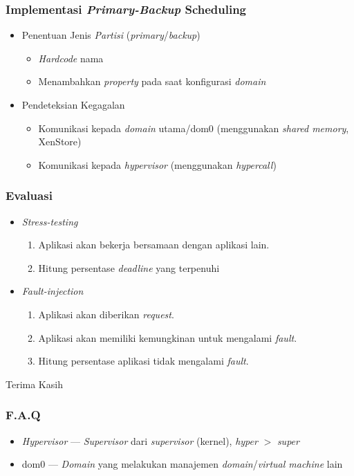 \documentclass[xetex]{beamer}
\begin{document}
    \begin{frame}
        \frametitle{Implementasi \textit{Primary-Backup} Scheduling}
        \begin{itemize}
            \item Penentuan Jenis \textit{Partisi} (\textit{primary}/\textit{backup})
                \begin{itemize}
                    \item \textit{Hardcode} nama
                    \item Menambahkan \textit{property} pada saat konfigurasi \textit{domain}
                \end{itemize}
            \item Pendeteksian Kegagalan
                \begin{itemize}
                    \item Komunikasi kepada \textit{domain} utama/dom0 (menggunakan \textit{shared memory}, XenStore)
                    \item Komunikasi kepada \textit{hypervisor} (menggunakan \textit{hypercall})
                \end{itemize}
        \end{itemize}
    \end{frame}
    \begin{frame}
        \frametitle{Evaluasi}
        \begin{itemize}
            \item \textit{Stress-testing}
                \begin{enumerate}
                    \item Aplikasi akan bekerja bersamaan dengan aplikasi lain.
                    \item Hitung persentase \textit{deadline} yang terpenuhi
                \end{enumerate}
            \item \textit{Fault-injection}
                \begin{enumerate}
                    \item Aplikasi akan diberikan \textit{request}.
                    \item Aplikasi akan memiliki kemungkinan untuk mengalami \textit{fault}.
                    \item Hitung persentase aplikasi tidak mengalami \textit{fault}.
                \end{enumerate}
        \end{itemize}
    \end{frame}
    \begin{frame}
        \Huge Terima Kasih
    \end{frame}
    \begin{frame}
        \frametitle{F.A.Q}
        \begin{itemize}
            \item \textit{Hypervisor} --- \textit{Supervisor} dari \textit{supervisor} (kernel), \textit{hyper} $>$ \textit{super}
            \item dom0 --- \textit{Domain} yang melakukan manajemen \textit{domain}/\textit{virtual machine} lain
        \end{itemize}
    \end{frame}
\end{document}
